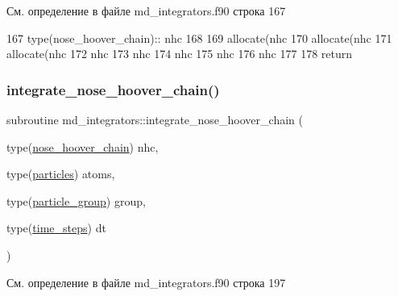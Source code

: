 См. определение в файле md\+\_\+integrators.\+f90 строка 167


\begin{DoxyCode}
167     \textcolor{keywordtype}{type}(nose\_hoover\_chain):: nhc
168 
169     \textcolor{keyword}{allocate}(nhc%
170     \textcolor{keyword}{allocate}(nhc%
171     \textcolor{keyword}{allocate}(nhc%
172     nhc%
173     nhc%
174     nhc%
175     nhc%
176     nhc%
177 
178     \textcolor{keywordflow}{return}
\end{DoxyCode}
\mbox{\label{namespacemd__integrators_a769781abbe7ac3aaacf761d6321d4722}} 
\subsubsection{\texorpdfstring{integrate\+\_\+nose\+\_\+hoover\+\_\+chain()}{integrate\_nose\_hoover\_chain()}}
{\footnotesize\ttfamily subroutine md\+\_\+integrators\+::integrate\+\_\+nose\+\_\+hoover\+\_\+chain (\begin{DoxyParamCaption}\item[{type(\mbox{\hyperlink{structmd__general_1_1nose__hoover__chain}{nose\+\_\+hoover\+\_\+chain}})}]{nhc,  }\item[{type(\mbox{\hyperlink{structmd__general_1_1particles}{particles}})}]{atoms,  }\item[{type(\mbox{\hyperlink{structmd__general_1_1particle__group}{particle\+\_\+group}})}]{group,  }\item[{type(\mbox{\hyperlink{structmd__general_1_1time__steps}{time\+\_\+steps}})}]{dt }\end{DoxyParamCaption})}



См. определение в файле md\+\_\+integrators.\+f90 строка 197


